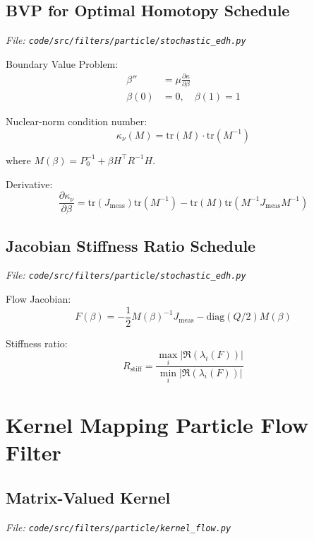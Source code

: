 \documentclass[12pt]{article}
\begin{document}
\subsection{BVP for Optimal Homotopy Schedule}
\textit{File: \texttt{code/src/filters/particle/stochastic\_edh.py}}

Boundary Value Problem:
\begin{align}
\beta'' &= \mu \frac{\partial \kappa}{\partial \beta} \\
\beta(0) &= 0, \quad \beta(1) = 1
\end{align}

Nuclear-norm condition number:
\begin{equation}
\kappa_\nu(M) = \text{tr}(M) \cdot \text{tr}(M^{-1})
\end{equation}

where $M(\beta) = P_0^{-1} + \beta H^\top R^{-1} H$.

Derivative:
\begin{equation}
\frac{\partial \kappa_\nu}{\partial \beta} = \text{tr}(J_{\text{meas}}) \text{tr}(M^{-1}) - \text{tr}(M) \text{tr}(M^{-1} J_{\text{meas}} M^{-1})
\end{equation}

\subsection{Jacobian Stiffness Ratio Schedule}
\textit{File: \texttt{code/src/filters/particle/stochastic\_edh.py}}

Flow Jacobian:
\begin{equation}
F(\beta) = -\frac{1}{2} M(\beta)^{-1} J_{\text{meas}} - \text{diag}(Q/2) M(\beta)
\end{equation}

Stiffness ratio:
\begin{equation}
R_{\text{stiff}} = \frac{\max_i |\Re(\lambda_i(F))|}{\min_i |\Re(\lambda_i(F))|}
\end{equation}

\section{Kernel Mapping Particle Flow Filter}

\subsection{Matrix-Valued Kernel}
\textit{File: \texttt{code/src/filters/particle/kernel\_flow.py}}
\end{document}
